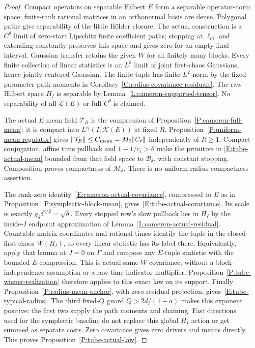 \begin{proof}
  Compact operators on separable Hilbert $E$ form a separable
  operator-norm space: finite-rank rational matrices in an
  orthonormal basis are dense.
  Polygonal paths give separability of the little H\"older closure.
  The actual construction is a $C^\theta$ limit of zero-start
  Lipschitz finite coefficient paths; stopping at $\ell_m$
  and extending constantly preserves this space and gives zero
  for an empty final interval.
  Gaussian transfer retains the given $W$ for all finitely many blocks.
  Every finite collection of linear statistics is an $L^2$ limit
  of joint first-chaos Gaussians, hence jointly centered Gaussian.
  The finite tuple has finite $L^2$ norm by the fixed-parameter
  path moments in Corollary~\ref{C:radius-covariance-residuals}.
  The raw Hilbert space $H_I$ is separable by
  Lemma~\ref{L:cameron-supported-tensor}.
  No separability of all $\mathcal L(E)$ or full $C^\theta$ is claimed.

  The actual $E$ mean field $\mathcal T_R$ is the compression
  of Proposition~\ref{P:cameron-full-mean}; it is compact into
  $L^{r_t}(I;\mathcal K(E))$ at fixed $R$.
  Proposition~\ref{P:uniform-mean-regulator} gives
  $\|\mathcal T_R\|\le C_{\rm mean}=M_0\|C_t\|$ independently of $R\ge1$.
  Compact conjugation, affine time pullback and
  $1-1/r_t>\theta$ make the primitive in
  \eqref{E:tube-actual-mean} bounded from that field space to
  $\mathscr B_\delta$, with constant stopping.
  Composition proves compactness of $\mathcal M_\delta$.
  There is no uniform-radius compactness assertion.

  The rank-zero identity~\eqref{E:cameron-actual-covariance},
  compressed to $E$ as in Proposition~\ref{P:symplectic-block-mean},
  gives~\eqref{E:tube-actual-covariance}.
  Its scale is exactly $g_\delta\delta^{a/2}=\sqrt\delta$.
  Every stopped row's slow pullback lies in $H_I$ by the
  inside-$I$ endpoint approximation of Lemma~\ref{L:cameron-actual-residual}.
  Countable matrix coordinates and rational times identify the
  tuple in the closed first chaos $W(H_I)$, so every linear
  statistic has its label there.
  Equivalently, apply that lemma at $J=0$ on $F$ and compose
  any $E$-tuple statistic with the bounded $E$-compression.
  This is actual same-$W$ covariance, without a block-independence
  assumption or a raw time-indicator multiplier.
  Proposition~\ref{P:tube-wiener-realization} therefore applies
  to this exact law on its support.
  Finally Proposition~\ref{P:radius-mean-anchor}, with zero
  residual projection, gives~\eqref{E:tube-typical-radius}.
  The third fixed-$Q$ guard $Q>2d/(1-a)$ makes this exponent positive;
  the first two supply the path moments and chaining.
  Fast directions used for the symplectic baseline do not replace
  this global $H_I$ action or get summed as separate costs.
  Zero covariance gives zero drivers and means directly.
  This proves Proposition~\ref{P:tube-actual-law}.
\end{proof}

